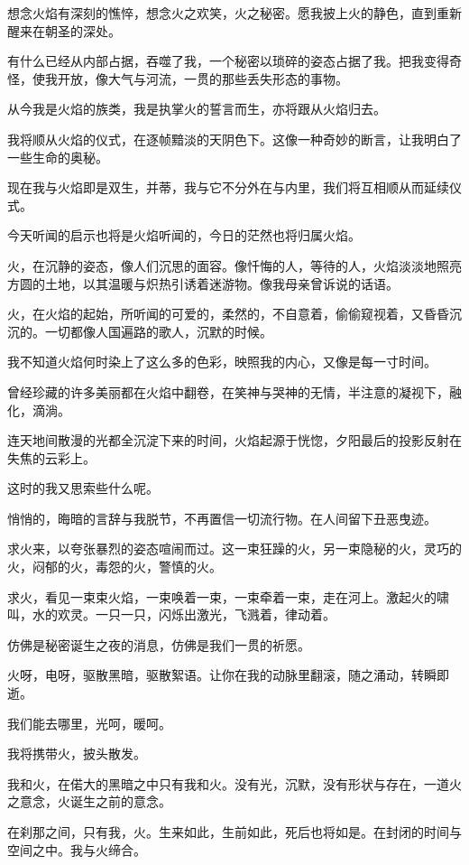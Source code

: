 \documentclass[UTF8]{article}
\begin{document}
\par 想念火焰有深刻的憔悴，想念火之欢笑，火之秘密。愿我披上火的静色，直到重新醒来在朝圣的深处。
\par 有什么已经从内部占据，吞噬了我，一个秘密以琐碎的姿态占据了我。把我变得奇怪，使我开放，像大气与河流，一贯的那些丢失形态的事物。
\par 从今我是火焰的族类，我是执掌火的誓言而生，亦将跟从火焰归去。
\par 我将顺从火焰的仪式，在逐帧黯淡的天阴色下。这像一种奇妙的断言，让我明白了一些生命的奥秘。
\par 现在我与火焰即是双生，并蒂，我与它不分外在与内里，我们将互相顺从而延续仪式。
\par 今天听闻的启示也将是火焰听闻的，今日的茫然也将归属火焰。
\par 火，在沉静的姿态，像人们沉思的面容。像忏悔的人，等待的人，火焰淡淡地照亮方圆的土地，以其温暖与炽热引诱着迷游物。像我母亲曾诉说的话语。
\par 火，在火焰的起始，所听闻的可爱的，柔然的，不自意着，偷偷窥视着，又昏昏沉沉的。一切都像人国遍路的歌人，沉默的时候。
\par 我不知道火焰何时染上了这么多的色彩，映照我的内心，又像是每一寸时间。
\par 曾经珍藏的许多美丽都在火焰中翻卷，在笑神与哭神的无情，半注意的凝视下，融化，滴淌。
\par 连天地间散漫的光都全沉淀下来的时间，火焰起源于恍惚，夕阳最后的投影反射在失焦的云彩上。
\par 这时的我又思索些什么呢。
\par 悄悄的，晦暗的言辞与我脱节，不再置信一切流行物。在人间留下丑恶曳迹。
\par 求火来，以夸张暴烈的姿态喧闹而过。这一束狂躁的火，另一束隐秘的火，灵巧的火，闷郁的火，毒怨的火，警慎的火。
\par 求火，看见一束束火焰，一束唤着一束，一束牵着一束，走在河上。激起火的啸叫，水的欢灵。一只一只，闪烁出激光，飞溅着，律动着。
\par 仿佛是秘密诞生之夜的消息，仿佛是我们一贯的祈愿。
\par 火呀，电呀，驱散黑暗，驱散絮语。让你在我的动脉里翻滚，随之涌动，转瞬即逝。
\par 我们能去哪里，光呵，暖呵。
\\[0.6cm]
\par 我将携带火，披头散发。
\par 我和火，在偌大的黑暗之中只有我和火。没有光，沉默，没有形状与存在，一道火之意念，火诞生之前的意念。
\par 在刹那之间，只有我，火。生来如此，生前如此，死后也将如是。在封闭的时间与空间之中。我与火缔合。
\end{document}
